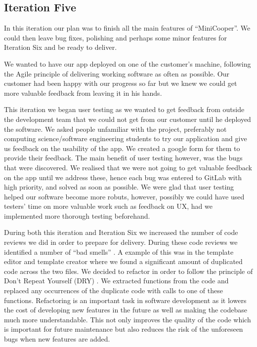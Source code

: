 \documentclass{l3proj}
\begin{document}
\subsection{Iteration Five}

In this iteration our plan was to finish all the main features of ``MiniCooper''. We could then leave bug fixes, polishing and perhaps some minor features for Iteration Six and be ready to deliver.

We wanted to have our app deployed on one of the customer’s machine, following the Agile principle of delivering working software as often as possible. \cite{agilewebsite} Our customer had been happy with our progress so far but we knew we could get more valuable feedback from leaving it in his hands.  

This iteration we began user testing as we wanted to get feedback from outside the development team that we could not get from our customer until he deployed the software. We asked people unfamiliar with the project, preferably not computing science/software engineering students to try our application and give us feedback on the usability of the app. We created a google form for them to provide their feedback. The main benefit of user testing however, was the bugs that were discovered. We realised that we were not going to get valuable feedback on the app until we address these, hence each bug was entered to GitLab with high priority, and solved as soon as possible.
We were glad that user testing helped our software become more robuts, however, possibly we could have used testers' time on more valuable work such as feedback on UX, had we implemented more thorough testing beforehand.

During both this iteration and Iteration Six we increased the number of code reviews we did in order to prepare for delivery. During these code reviews we identified a number of ``bad smells'' \cite{Fowler}. A example of this was in the template editor and template creator where we found a significant amount of duplicated code across the two files. We decided to refactor in order to follow the principle of Don’t Repeat Yourself (DRY) \cite{HuntThomas}. We extracted functions from the code and replaced any occurrences of the duplicate code with calls to one of these functions. Refactoring is an important task in software development as it lowers the cost of developing new features in the future as well as making the codebase much more understandable. This not only improves the quality of the code which is important for future maintenance but also reduces the risk of the unforeseen bugs when new features are added.
\end{document}
